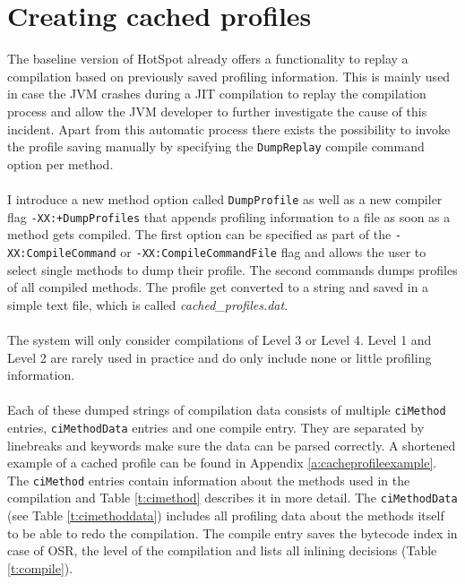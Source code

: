 \section{Creating cached profiles}
\label{s:creatingprofiles}
The baseline version of HotSpot already offers a functionality to replay a compilation based on previously saved profiling information.
This is mainly used in case the JVM crashes during a JIT compilation to replay the compilation process and allow the JVM developer to further investigate the cause of this incident.
Apart from this automatic process there exists the possibility to invoke the profile saving manually by specifying the \texttt{DumpReplay} compile command option per method.
\\\\
I introduce a new method option called \texttt{DumpProfile} as well as a new compiler flag \newline\texttt{-XX:+DumpProfiles} that appends profiling information to a file as soon as a method gets compiled. The first option can be specified as part of the \texttt{-XX:CompileCommand} or \texttt{-XX:CompileCommandFile} flag and allows the user to select single methods to dump their profile. The second commands dumps profiles of all compiled methods.
The profile get converted to a string and saved in a simple text file, which is called \textit{cached\_profiles.dat}.
\\\\
The system will only consider compilations of Level 3 or Level 4. Level 1 and Level 2 are rarely used in practice and do only include none or little profiling information.
\\\\
Each of these dumped strings of compilation data consists of multiple \texttt{ciMethod} entries, \texttt{ciMethodData} entries and one compile entry. They are separated by linebreaks and keywords make sure the data can be parsed correctly. A shortened example of a cached profile can be found in Appendix \ref{a:cacheprofileexample}. The \texttt{ciMethod} entries contain information about the methods used in the compilation and Table \ref{t:cimethod} describes it in more detail. The \texttt{ciMethodData} (see Table \ref{t:cimethoddata}) includes all profiling data about the methods itself to be able to redo the compilation.
The compile entry saves the bytecode index in case of OSR, the level of the compilation and lists all inlining decisions (Table \ref{t:compile}).
\\\\
